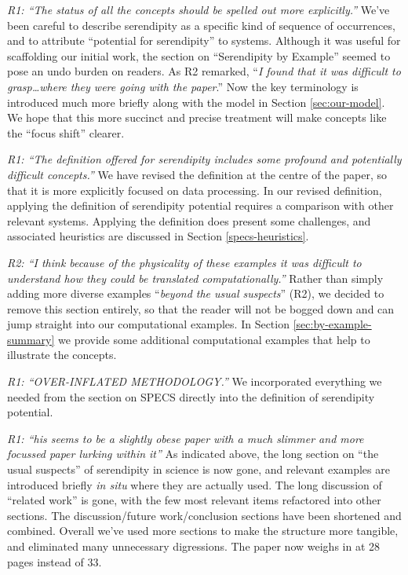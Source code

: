 \emph{R1: ``The status of all the concepts should be spelled out more
  explicitly.''}  We've been careful to describe serendipity as a
specific kind of sequence of occurrences, and to attribute ``potential
for serendipity'' to systems.  Although it was useful for scaffolding
our initial work, the section on ``Serendipity by Example'' seemed to
pose an undo burden on readers.  As R2 remarked, ``\emph{I found that
  it was difficult to grasp\ldots where they were going with the
  paper}.''  Now the key terminology is introduced much more briefly
along with the model in Section \ref{sec:our-model}.  We hope that
this more succinct and precise treatment will make concepts like the
``focus shift'' clearer.  

\emph{R1: ``The definition offered for serendipity includes some
  profound and potentially difficult concepts.''} We have revised the
definition at the centre of the paper, so that it is more explicitly
focused on data processing.  In our revised definition, applying the
definition of serendipity potential requires a comparison with other
relevant systems.  Applying the definition does present some
challenges, and associated heuristics are discussed in Section
\ref{specs-heuristics}.

\emph{R2: ``I think because of the physicality of these examples it
  was difficult to understand how they could be translated
  computationally.''}  Rather than simply adding more diverse examples
``\emph{beyond the usual suspects}'' (R2), we decided to remove this
section entirely, so that the reader will not be bogged down and can
jump straight into our computational examples.  In Section
\ref{sec:by-example-summary} we provide some additional computational
examples that help to illustrate the concepts.

\emph{R1: ``OVER-INFLATED METHODOLOGY.''}  We incorporated everything
we needed from the section on SPECS directly into the definition of
serendipity potential.

\emph{R1: ``{\upshape[T]}his seems to be a slightly obese paper with a
  much slimmer and more focussed paper lurking within it''} As
indicated above, the long section on ``the usual suspects'' of
serendipity in science is now gone, and relevant examples are
introduced briefly \emph{in situ} where they are actually used.  The
long discussion of ``related work'' is gone, with the few most
relevant items refactored into other sections.  The discussion/future
work/conclusion sections have been shortened and combined.  Overall
we've used more sections to make the structure more tangible, and
eliminated many unnecessary digressions.  The paper now weighs in at
28 pages instead of 33.

